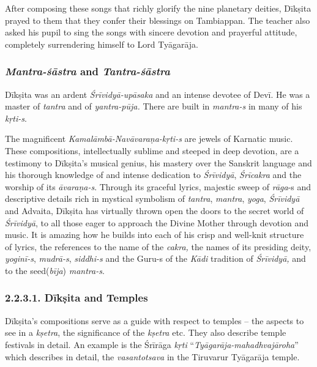 After composing these songs that richly glorify the nine planetary deities, Dīkṣita prayed to them that they confer their blessings on Tambiappan. The teacher also asked his pupil to sing the songs with sincere devotion and prayerful attitude, completely surrendering himself to Lord Tyāgarāja.


\subsubsection*{\textit{Mantra-śāstra} and \textit{Tantra-śāstra}}

Dīkṣita was an ardent \textit{Śrīvidyā-upāsaka} and an intense devotee of Devī. He was a master of \textit{tantra} and of \textit{yantra-pūja.} There are built in \textit{mantra-s} in many of his \textit{kṛti-s}.

The magnificent \textit{Kamalāmbā-Navāvaraṇa-kṛti-s} are jewels of Karnatic music. These compositions, intellectually sublime and steeped in deep devotion, are a testimony to Dīkṣita’s musical genius, his mastery over the Sanskrit language and his thorough knowledge of and intense dedication to \textit{Śrīvidyā}, \textit{Śrīcakra} and the worship of its \textit{āvaraṇa-s}. Through its graceful lyrics, majestic sweep of \textit{rāga}-s and descriptive details rich in mystical symbolism of \textit{tantra}, \textit{mantra}, \textit{yoga}, \textit{Śrīvidyā} and Advaita, Dīkṣita has virtually thrown open the doors to the secret world of \textit{Śrīvidyā}, to all those eager to approach the Divine Mother through devotion and music. It is amazing how he builds into each of his crisp and well-knit structure of lyrics, the references to the name of the \textit{cakra,} the names of its presiding deity, \textit{yoginī-s}, \textit{mudrā-s}, \textit{siddhi-s} and the Guru-s of the \textit{Kādi} tradition of \textit{Śrīvidyā,} and to the seed(\textit{bīja}) \textit{mantra-s}.


\subsubsection*{2.2.3.1. Dīkṣita and Temples}

Dīkṣita’s compositions serve as a guide with respect to temples – the aspects to see in a \textit{kṣetra}, the significance of the \textit{kṣetra} etc. They also describe temple festivals in detail. An example is the Śrīrāga\textit{ kṛti} “\textit{Tyāgarāja-mahadhvajāroha}” which describes in detail, the \textit{vasantotsava} in the Tiruvarur Tyāgarāja temple.


